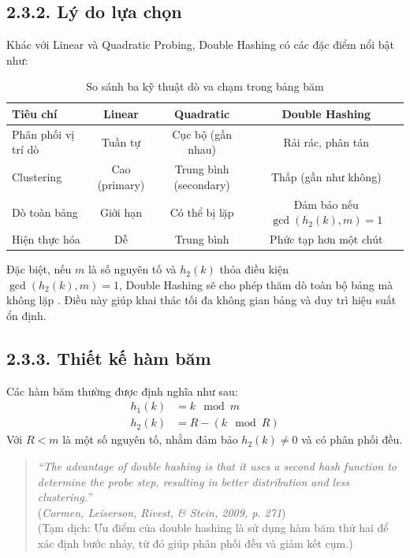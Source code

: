\documentclass[12pt,a4paper]{report}
\begin{document}
\subsection*{2.3.2. Lý do lựa chọn}
\noindent \indent Khác với Linear và Quadratic Probing, Double Hashing có các đặc điểm nổi bật như:
\begin{table}[H]
\centering
\begin{tabular}{|l|c|c|c|}
\hline
\textbf{Tiêu chí} & \textbf{Linear} & \textbf{Quadratic} & \textbf{Double Hashing} \\
\hline
Phân phối vị trí dò & Tuần tự & Cục bộ (gần nhau) & Rải rác, phân tán \\
Clustering          & Cao (primary) & Trung bình (secondary) & Thấp (gần như không) \\
Dò toàn bảng        & Giới hạn & Có thể bị lặp & Đảm bảo nếu $\gcd(h_2(k), m) = 1$ \\
Hiện thực hóa       & Dễ & Trung bình & Phức tạp hơn một chút \\
\hline
\end{tabular}
\caption{So sánh ba kỹ thuật dò va chạm trong bảng băm}
\end{table}
Đặc biệt, nếu $m$ là số nguyên tố và $h_2(k)$ thỏa điều kiện $\gcd(h_2(k), m) = 1$, Double Hashing sẽ cho phép thăm dò toàn bộ bảng mà không lặp \cite{knuth1998}. Điều này giúp khai thác tối đa không gian bảng và duy trì hiệu suất ổn định.
\subsection*{2.3.3. Thiết kế hàm băm}
\noindent \indent Các hàm băm thường được định nghĩa như sau:
\begin{align*}
h_1(k) &= k \mod m \\
h_2(k) &= R - (k \mod R)
\end{align*}
\noindent \indent Với $R < m$ là một số nguyên tố, nhằm đảm bảo $h_2(k) \neq 0$ và có phân phối đều.

\begin{quote}
\textit{“The advantage of double hashing is that it uses a second hash function to determine the probe step, resulting in better distribution and less clustering.”} \\
(\textit{Cormen, Leiserson, Rivest, \& Stein, 2009, p. 271}) \\
(Tạm dịch: Ưu điểm của double hashing là sử dụng hàm băm thứ hai để xác định bước nhảy, từ đó giúp phân phối đều và giảm kết cụm.)
\end{quote}
\end{document}
